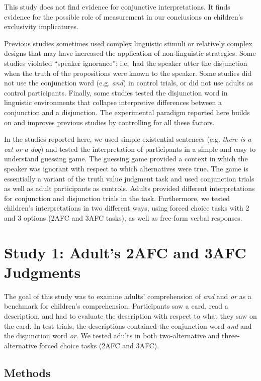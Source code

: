 \documentclass[floatsintext,man]{apa6}
\theoremstyle{definition}
\theoremstyle{definition}
\theoremstyle{definition}
\theoremstyle{remark}
\begin{document}
This study does not find evidence for conjunctive interpretations. It
finds evidence for the possible role of measurement in our conclusions
on children's exclusivity implicatures.

Previous studies sometimes used complex linguistic stimuli or relatively
complex designs that may have increased the application of
non-linguistic strategies. Some studies violated \enquote{speaker
ignorance}; i.e.~had the speaker utter the disjunction when the truth of
the propositions were known to the speaker. Some studies did not use the
conjunction word (e.g. \emph{and}) in control trials, or did not use
adults as control participants. Finally, some studies tested the
disjunction word in linguistic environments that collapse interpretive
differences between a conjunction and a disjunction. The experimental
paradigm reported here builds on and improves previous studies by
controlling for all these factors.

In the studies reported here, we used simple existential sentences (e.g.
\emph{there is a cat or a dog}) and tested the interpretation of
participants in a simple and easy to understand guessing game. The
guessing game provided a context in which the speaker was ignorant with
respect to which alternatives were true. The game is essentially a
variant of the truth value judgment task and used conjunction trials as
well as adult participants as controls. Adults provided different
interpretations for conjunction and disjunction trials in the task.
Furthermore, we tested children's interpretations in two different ways,
using forced choice tasks with 2 and 3 options (2AFC and 3AFC tasks), as
well as free-form verbal responses.

\section{Study 1: Adult's 2AFC and 3AFC Judgments}\label{study1}

The goal of this study was to examine adults' comprehension of
\emph{and} and \emph{or} as a benchmark for children's comprehension.
Participants saw a card, read a description, and had to evaluate the
description with respect to what they saw on the card. In test trials,
the descriptions contained the conjunction word \emph{and} and the
disjunction word \emph{or}. We tested adults in both two-alternative and
three-alternative forced choice tasks (2AFC and 3AFC).

\subsection{Methods}\label{methods}
\end{document}
